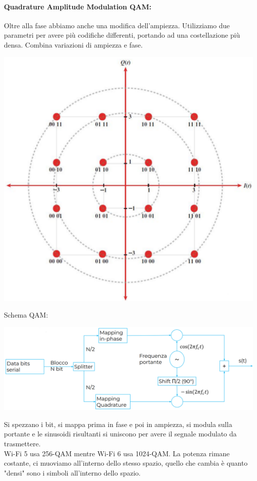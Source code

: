 \newpage

\paragraph{Quadrature Amplitude Modulation QAM:} Oltre alla fase abbiamo anche una modifica dell'ampiezza. Utilizziamo due parametri per avere più codifiche differenti, portando ad una costellazione più densa. Combina variazioni di ampiezza e fase. 
\begin{center}
	\includegraphics[width=0.6\linewidth]{img/wireless/costellazione2}
\end{center}
Schema QAM:
\begin{center}
	\includegraphics[width=0.9\linewidth]{img/wireless/schemaQAM}
\end{center}
Si spezzano i bit, si mappa prima in fase e poi in ampiezza, si modula sulla portante e le sinusoidi risultanti si uniscono per avere il segnale modulato da trasmettere.\\


Wi-Fi 5 usa 256-QAM mentre Wi-Fi 6 usa 1024-QAM. La potenza rimane costante, ci muoviamo all'interno dello stesso spazio, quello che cambia è quanto "densi" sono i simboli all'interno dello spazio.\\

